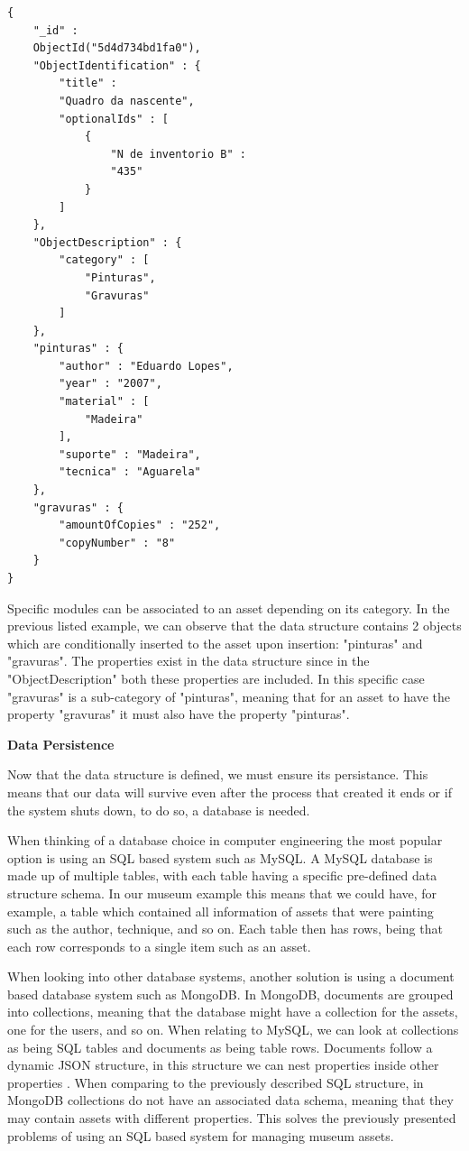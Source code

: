     \begin{lstlisting}[caption={Example of an asset's JSON data structure stored in the database.},label={assetJSON}]
{
    "_id" : 
    ObjectId("5d4d734bd1fa0"),
    "ObjectIdentification" : {
        "title" : 
        "Quadro da nascente",
        "optionalIds" : [
            {
                "N de inventorio B" : 
                "435"
            }
        ]
    },
    "ObjectDescription" : {
        "category" : [
            "Pinturas",
            "Gravuras"
        ]
    },
    "pinturas" : {
        "author" : "Eduardo Lopes",
        "year" : "2007",
        "material" : [
            "Madeira"
        ],
        "suporte" : "Madeira",
        "tecnica" : "Aguarela"
    },
    "gravuras" : {
        "amountOfCopies" : "252",
        "copyNumber" : "8"
    }
}
\end{lstlisting}

Specific modules can be associated to an asset depending on its category. In the previous listed example, we can observe that the data structure contains 2 objects which are conditionally inserted to the asset upon insertion: "pinturas" and "gravuras". The properties exist in the data structure since in the "ObjectDescription" both these properties are included. In this specific case "gravuras" is a sub-category of "pinturas", meaning that for an asset to have the property "gravuras" it must also have the property "pinturas".

\vspace{4mm}
\textbf{Data Persistence}
\vspace{2mm}

Now that the data structure is defined, we must ensure its persistance. This means that our data will survive even after the process that created it ends or if the system shuts down, to do so, a database is needed.

When thinking of a database choice in computer engineering the most popular option is using an SQL based system such as MySQL. A MySQL database is made up of multiple tables, with each table having a specific pre-defined data structure schema. In our museum example this means that we could have, for example, a table which contained all information of assets that were painting such as the author, technique, and so on. Each table then has rows, being that each row corresponds to a single item such as an asset. 

When looking into other database systems, another solution is using a document based database system such as MongoDB. In MongoDB, documents are grouped into collections, meaning that the database might have a collection for the assets, one for the users, and so on. When relating to MySQL, we can look at collections as being SQL tables and documents as being table rows. Documents follow a dynamic JSON structure, in this structure we can nest properties inside other properties \cite{MongoDB2016MongoDBGuide}. When comparing to the previously described SQL structure, in MongoDB collections do not have an associated data schema, meaning that they may contain assets with different properties. This solves the previously presented problems of using an SQL based system for managing museum assets.

